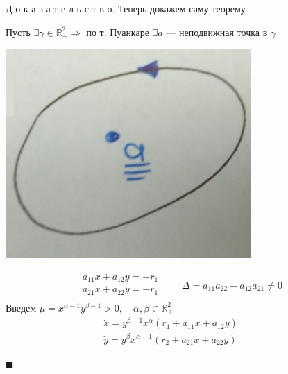\documentclass[oneside, final, 12pt]{article}
\theoremstyle{def}
\theoremstyle{th}
\theoremstyle{rem}
\renewenvironment{proof}{\par Д о к а з а т е л ь с т в о.}{\hfill$\blacksquare$}
\numberwithin{figure}{section}
\numberwithin{equation}{section}
\def\cntrKul{\hspace*{\fill}}
\begin{document}
	\begin{proof}{ Теперь докажем саму теорему} \vspace{3mm}
	
		Пусть $\exists \gamma \in \mathbb{R}^2_+ \Rightarrow$ по т. Пуанкаре $\exists a$ --- неподвижная точка 
		в $\gamma$ 
		\newline
		
		\begin{minipage}{0.3\textwidth}
			\begin{center} \includegraphics[width=0.7\textwidth]{pict/pict_6.png} \vspace{3mm}\end{center} 
		\end{minipage}
		\begin{minipage}{0.68\textwidth}
			$$
				\begin{gathered}
					a_{11}x + a_{12}y = -r_1 \\
					a_{21}x + a_{22}y = -r_1 \\
				\end{gathered} \qquad  \Delta = a_{11}a_{22} - a_{12}a_{21} \neq 0
			$$ \cntrKul Введем $\mu = x^{\alpha-1}y^{\beta -1}>0, \quad \alpha, \beta \in \mathbb{R}^2_+$ \cntrKul
			\begin{equation}
				\begin{gathered}
						\dot{x} = y^{\beta -1} x^{\alpha}(r_1 + a_{11}x + a_{12}y) \\
						\dot{y} = y^{\beta} x^{\alpha-1}(r_2 + a_{21}x + a_{22}y) 
				\end{gathered}\label{ch10_orb_eq} \qquad 
		\end{equation}
		\end{minipage}		
		

\end{proof}
\end{document}
